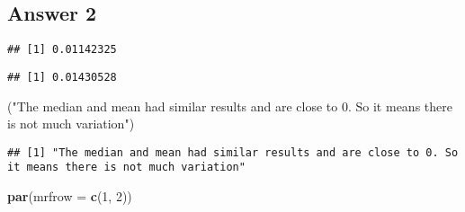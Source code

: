 \documentclass[
]{article}
\newenvironment{Shaded}{\begin{snugshade}}{\end{snugshade}}
\newcommand{\DataTypeTok}[1]{\textcolor[rgb]{0.13,0.29,0.53}{#1}}
\newcommand{\DecValTok}[1]{\textcolor[rgb]{0.00,0.00,0.81}{#1}}
\newcommand{\KeywordTok}[1]{\textcolor[rgb]{0.13,0.29,0.53}{\textbf{#1}}}
\newcommand{\NormalTok}[1]{#1}
\newcommand{\OperatorTok}[1]{\textcolor[rgb]{0.81,0.36,0.00}{\textbf{#1}}}
\newcommand{\StringTok}[1]{\textcolor[rgb]{0.31,0.60,0.02}{#1}}
\begin{document}
\hypertarget{answer-2}{%
\subsection{Answer 2}\label{answer-2}}

\begin{Shaded}
\end{Shaded}

\begin{verbatim}
## [1] 0.01142325
\end{verbatim}

\begin{Shaded}
\end{Shaded}

\begin{verbatim}
## [1] 0.01430528
\end{verbatim}

\begin{Shaded}
\begin{Highlighting}[]
\NormalTok{(}\StringTok{"The median and mean had similar results and are close to 0. So it means there is not much variation"}\NormalTok{)}
\end{Highlighting}
\end{Shaded}

\begin{verbatim}
## [1] "The median and mean had similar results and are close to 0. So it means there is not much variation"
\end{verbatim}

\begin{Shaded}
\begin{Highlighting}[]
\KeywordTok{par}\NormalTok{(}\DataTypeTok{mrfrow =} \KeywordTok{c}\NormalTok{(}\DecValTok{1}\NormalTok{, }\DecValTok{2}\NormalTok{))}
\end{Highlighting}
\end{Shaded}
\end{document}
